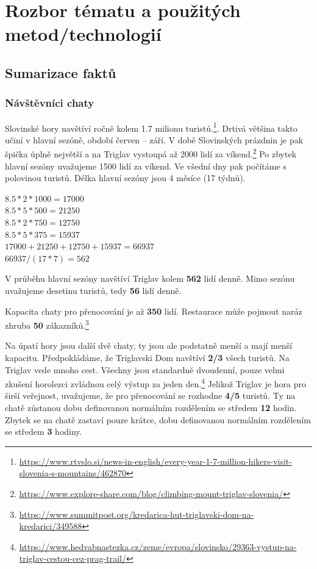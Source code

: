 \section{Rozbor tématu a použitých metod/technologií}\label{chap:analysis}

\subsection{Sumarizace faktů}



\subsubsection{Návštěvníci chaty}

Slovinské hory navštíví ročně kolem 1.7 milionu turistů.\footnote{\url{https://www.rtvslo.si/news-in-english/every-year-1-7-million-hikers-visit-slovenia-s-mountains/462870}}. Drtivá většina takto učiní v hlavní sezóně, období červen -- září. V době Slovinských prázdnin je pak špička úplně největší a na Triglav vystoupá až 2000 lidí za víkend.\footnote{\url{https://www.explore-share.com/blog/climbing-mount-triglav-slovenia/}} Po zbytek hlavní sezóny uvažujeme 1500 lidí za víkend. Ve všední dny pak počítáme s polovinou turistů. Délka hlavní sezóny jsou 4 měsíce (17 týdnů).

$8.5*2*1000=17000$\\
$8.5*5*500=21250$\\
$8.5*2*750=12750$\\
$8.5*5*375=15937$\\
$17000+21250+12750+15937=66937$\\
$66937/(17*7)=562$

V průběhu hlavní sezóny navštíví Triglav kolem \textbf{562} lidí denně. Mimo sezónu uvažujeme desetinu turistů, tedy \textbf{56} lidí denně.

Kapacita chaty pro přenocování je až \textbf{350} lidí. Restaurace může pojmout naráz zhruba \textbf{50} zákazníků.\footnote{\url{https://www.summitpost.org/kredarica-hut-triglavski-dom-na-kredarici/349588}}

Na úpatí hory jsou další dvě chaty, ty jsou ale podstatně menší a mají menší kapacitu. Předpokládáme, že Triglavski Dom navštíví \textbf{2/3} všech turistů. Na Triglav vede mnoho cest. Všechny jsou standardně dvoudenní, pouze velmi zkušení horolezci zvládnou celý výstup za jeden den.\footnote{\url{https://www.hedvabnastezka.cz/zeme/evropa/slovinsko/29363-vystup-na-triglav-cestou-cez-prag-trail/}} Jelikož Triglav je hora pro širší veřejnost, uvažujeme, že pro přenocování se rozhodne \textbf{4/5} turistů. Ty na chatě zůstanou dobu definovanou normálním rozdělením se středem \textbf{12} hodin. Zbytek se na chatě zastaví pouze krátce, dobu definovanou normálním rozdělením se středem \textbf{3} hodiny.


